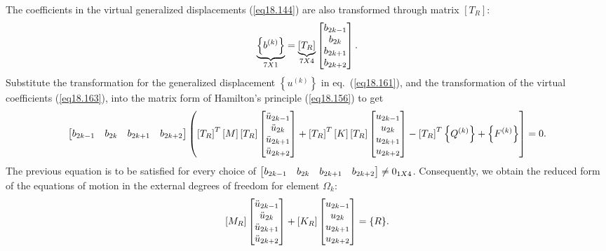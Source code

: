 \documentclass{AeroStructure-ERJohnson}
\begin{document}
The coefficients in the virtual generalized displacements (\ref{eq18.144}) are also transformed through matrix $\left[T_{R}\right]$:
\begin{align}\label{eq18.163}
\underbrace{\left\{b^{(k)}\right\}}_{7 X 1}=\underbrace{\left[T_{R}\right]}_{7 X 4}\left[\begin{array}{@{}c@{}}
b_{2 k-1} \\b_{2 k} \\b_{2 k+1} \\b_{2 k+2}\end{array}\right].
\end{align}
Substitute the transformation for the generalized displacement $\left\{u^{(k)}\right\}$ in eq.~(\ref{eq18.161}), and the transformation of the virtual coefficients (\ref{eq18.163}), into the matrix form of Hamilton's principle (\ref{eq18.156}) to get
\begin{align}\label{eq18.164}
\left[\begin{array}{@{}llll@{}}b_{2 k-1} & b_{2 k} & b_{2 k+1} & b_{2 k+2}\end{array}\right]\left(\left[T_{R}\right]^{T}[M]\left[T_{R}\right]\left[\begin{array}{@{}c@{}}\ddot{u}_{2 k-1} \\\ddot{u}_{2 k} \\\ddot{u}_{2 k+1} \\\ddot{u}_{2 k+2}\end{array}\right]+\left[T_{R}\right]^{T}[K]\left[T_{R}\right]\left[\begin{array}{@{}c@{}}u_{2 k-1} \\u_{2 k} \\u_{2 k+1} \\u_{2 k+2}\end{array}\right]-\left[T_{R}\right]^{T}\left\{Q^{(k)}\right\}+\left\{F^{(k)}\right\}\right]=0.
\end{align}
The previous equation is to be satisfied for every choice of $\left[\begin{array}{@{}llll@{}}b_{2 k-1} & b_{2 k} & b_{2 k+1} & b_{2 k+2}\end{array}\right] \neq 0_{1 X 4}$. Consequently, we obtain the reduced form of the equations of motion in the external degrees of freedom for element $\Omega_k$:
\begin{align}\label{eq18.165}
\left[M_{R}\right]\left[\begin{array}{@{}c@{}}\ddot{u}_{2 k-1} \\\ddot{u}_{2 k} \\\ddot{u}_{2 k+1} \\\ddot{u}_{2 k+2}\end{array}\right]+\left[K_{R}\right]\left[\begin{array}{@{}c@{}}u_{2 k-1} \\u_{2 k} \\u_{2 k+1} \\u_{2 k+2}\end{array}\right]=\{R\}.
\end{align}
\end{document}
